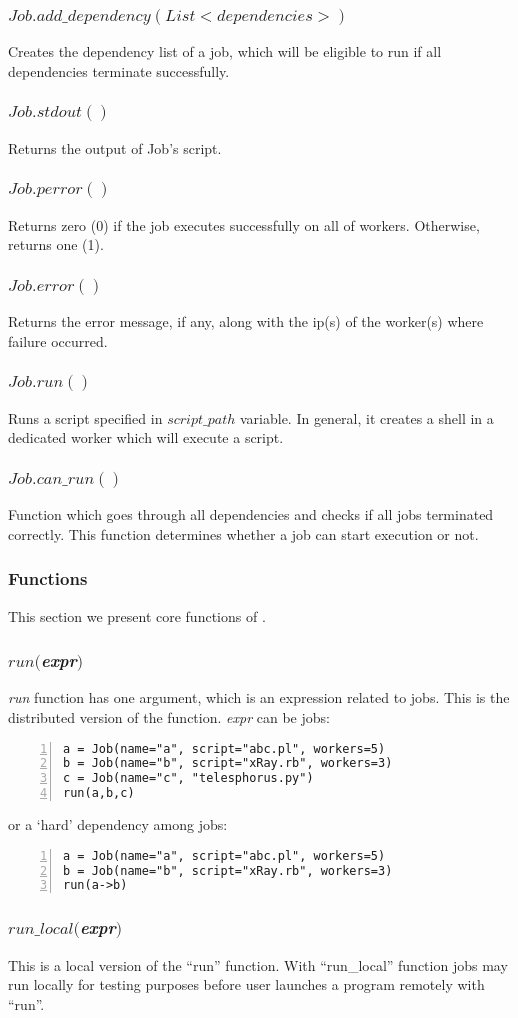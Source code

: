 \subsubsection*{$Job.add\_dependency(List <dependencies>)$}
Creates the dependency list of a job, which will be eligible to run if all dependencies terminate successfully.
\subsubsection*{$Job.stdout()$}
Returns the output of Job's script.
\subsubsection*{$Job.perror()$}
Returns zero (0) if the job executes successfully on all of workers. Otherwise, returns one (1).
\subsubsection*{$Job.error()$}
Returns the error message, if any, along with the ip(s) of the worker(s) where failure occurred.
\subsubsection*{$Job.run()$}
Runs a script specified in $script\_path$ variable. In general, it creates a shell in a dedicated worker which will execute a script.
\subsubsection*{$Job.can\_run()$}
Function which goes through all dependencies and checks if all jobs terminated correctly. This function determines whether
a job can start execution or not.

\subsubsection*{\lang{} Functions}

This section we present core functions of \lang{}.
\subsubsection*{$run($\textit{expr}$)$}
\textit{run} function has one argument, which is an expression related to jobs.
This is the distributed version of the function.
\textit{expr} can be jobs:
\begin{Verbatim}[numbers=left]
a = Job(name="a", script="abc.pl", workers=5)
b = Job(name="b", script="xRay.rb", workers=3)
c = Job(name="c", "telesphorus.py")
run(a,b,c)
\end{Verbatim}
or a `hard' dependency among jobs:
\begin{Verbatim}[numbers=left]
a = Job(name="a", script="abc.pl", workers=5)
b = Job(name="b", script="xRay.rb", workers=3)
run(a->b)
\end{Verbatim}
\subsubsection*{$run\_local($\textit{expr}$)$}
This is a local version of the ``run'' function. With ``run\_local'' function jobs may run locally for testing purposes before user launches a program remotely with ``run''.
